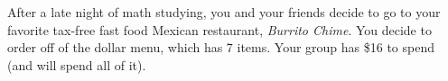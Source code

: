 \begin{questions}



\question After a late night of math studying, you and your friends decide to go to your favorite tax-free fast food Mexican restaurant, {\em Burrito Chime}.  You decide to order off of the dollar menu, which has 7 items.  Your group has \$16 to spend (and will spend all of it). 
\begin{parts}

\end{parts}
\end{questions}
